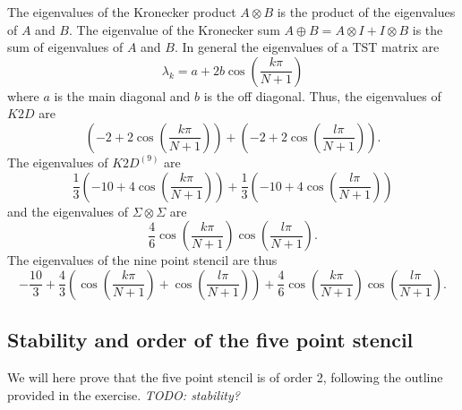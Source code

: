The eigenvalues of the Kronecker product $A \otimes B$ is the product of the eigenvalues of $A$ and $B$.
The eigenvalue of the Kronecker sum $A\oplus B = A \otimes I + I \otimes B$ is the sum of eigenvalues of $A$ and $B$.
In general the eigenvalues of a TST matrix are
\begin{equation*}
	\lambda_k = a + 2 b \cos\left(\frac{k \pi}{N + 1}\right)
\end{equation*}
where $a$ is the main diagonal and $b$ is the off diagonal.
Thus, the eigenvalues of $K2D$ are
$$
\left(-2 + 2\cos\left(\frac{k \pi}{N + 1}\right)\right)
+
\left(-2 + 2\cos\left(\frac{l \pi}{N + 1}\right)\right).
$$
The eigenvalues of $K2D^{(9)}$ are
$$
\frac13\left(-10 + 4\cos\left(\frac{k \pi}{N + 1}\right)\right)
+
\frac13\left(-10 + 4\cos\left(\frac{l \pi}{N + 1}\right)\right)
$$
and the eigenvalues of $\Sigma \otimes \Sigma$ are
$$
\frac46
\cos\left(\frac{k \pi}{N+1}\right)
\cos\left(\frac{l \pi}{N+1}\right).
$$
The eigenvalues of the nine point stencil are thus
\begin{equation}
  -\frac{10}{3}
  + \frac43
  \left(
  \cos(\frac{k \pi}{N+1})
  + \cos(\frac{l \pi}{N+1})
  \right)
  +
  \frac46
  \cos(\frac{k \pi}{N+1})
  \cos(\frac{l \pi}{N+1}).
\end{equation}

\newcommand{\inorm}[1]{
\lVert #1 \rVert_\infty
}

\subsection{Stability and order of the five point stencil}
We will here prove that the five point stencil is of order 2, following the outline provided in the exercise.
\emph{TODO: stability?}

